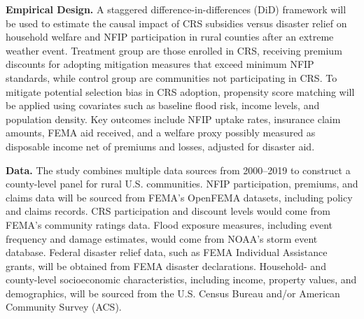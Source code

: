 \textbf{Empirical Design.} A staggered difference-in-differences (DiD) framework will be used to estimate the causal impact of CRS subsidies versus disaster relief on household welfare and NFIP participation in rural counties after an extreme weather event. Treatment group are those enrolled in CRS, receiving premium discounts for adopting mitigation measures that exceed minimum NFIP standards, while control group are communities not participating in CRS. To mitigate potential selection bias in CRS adoption, propensity score matching will be applied using covariates such as baseline flood risk, income levels, and population density. Key outcomes include NFIP uptake rates, insurance claim amounts, FEMA aid received, and a welfare proxy possibly measured as disposable income net of premiums and losses, adjusted for disaster aid.

\textbf{Data.} The study combines multiple data sources from 2000–2019 to construct a county-level panel for rural U.S. communities. NFIP participation, premiums, and claims data will be sourced from FEMA’s OpenFEMA datasets, including policy and claims records. CRS participation and discount levels would come from FEMA’s community ratings data. Flood exposure measures, including event frequency and damage estimates, would come from NOAA’s storm event database. Federal disaster relief data, such as FEMA Individual Assistance grants, will be obtained from FEMA disaster declarations. Household- and county-level socioeconomic characteristics, including income, property values, and demographics, will be sourced from the U.S. Census Bureau and/or American Community Survey (ACS).





